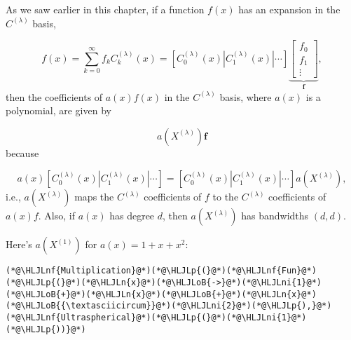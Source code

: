 \documentclass[12pt,landscape]{article}
\newcommand{\HLJLn}[1]{#1}
\newcommand{\HLJLnf}[1]{\textcolor[RGB]{66,102,213}{#1}}
\newcommand{\HLJLni}[1]{\textcolor[RGB]{59,151,46}{#1}}
\newcommand{\HLJLoB}[1]{\textcolor[RGB]{102,102,102}{\textbf{#1}}}
\newcommand{\HLJLp}[1]{#1}
\begin{document}
{As we saw earlier in this chapter, if a function $f(x)$ has an expansion in the $C^{(\lambda)}$ basis,

\[
f(x) = \sum_{k=0}^{\infty}f_kC^{(\lambda)}_k(x) = \left[ C^{(\lambda)}_0(x) | C^{(\lambda)}_1(x) | \cdots  \right]\underbrace{\begin{bmatrix}
f_0 \\
f_1 \\
\vdots
\end{bmatrix}}_{\mathbf{f}},
\]
then the coefficients of $a(x)f(x)$ in the $C^{(\lambda)}$ basis, where $a(x)$ is a polynomial, are given by

\[
a(X^{(\lambda)})\mathbf{f}
\]
because

\[
a(x)\left[ C^{(\lambda)}_0(x) | C^{(\lambda)}_1(x) | \cdots  \right] = \left[ C^{(\lambda)}_0(x) | C^{(\lambda)}_1(x) | \cdots  \right]a(X^{(\lambda)}),
\]
i.e., $a(X^{(\lambda)})$ maps the $C^{(\lambda)}$ coefficients of $f$ to the $C^{(\lambda)}$ coefficients of $a(x)f$.  Also, if $a(x)$ has degree $d$, then $a(X^{(\lambda)})$ has bandwidths $(d, d)$.

Here's $a(X^{(1)})$ for $a(x) = 1 + x + x^2$:


\begin{lstlisting}
(*@\HLJLnf{Multiplication}@*)(*@\HLJLp{(}@*)(*@\HLJLnf{Fun}@*)(*@\HLJLp{(}@*)(*@\HLJLn{x}@*)(*@\HLJLoB{->}@*)(*@\HLJLni{1}@*)(*@\HLJLoB{+}@*)(*@\HLJLn{x}@*)(*@\HLJLoB{+}@*)(*@\HLJLn{x}@*)(*@\HLJLoB{{\textasciicircum}}@*)(*@\HLJLni{2}@*)(*@\HLJLp{),}@*) (*@\HLJLnf{Ultraspherical}@*)(*@\HLJLp{(}@*)(*@\HLJLni{1}@*)(*@\HLJLp{))}@*)
\end{lstlisting}

}
\end{document}
